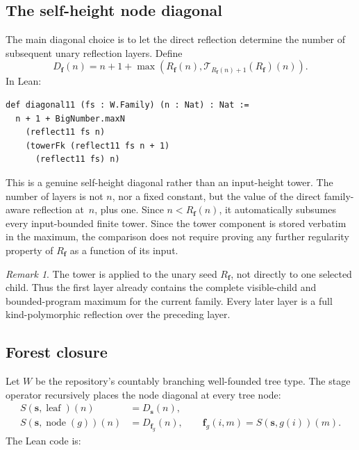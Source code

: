 \documentclass[11pt]{article}
\theoremstyle{definition}
\theoremstyle{remark}
\newtheorem{remark}[theorem]{Remark}
\newcommand{\Rfam}{\ensuremath{R_{\mathbf f}}}
\newcommand{\Dfam}{\ensuremath{D_{\mathbf f}}}
\begin{document}
\subsection{The self-height node diagonal}

The main diagonal choice is to let the direct reflection determine the number
of subsequent unary reflection layers. Define
\begin{equation}
\label{eq:diagonal11}
  \Dfam(n)=n+1+
  \max\left(
      \Rfam(n),
      \mathcal T_{\Rfam(n)+1}(\Rfam)(n)
  \right).
\end{equation}
In Lean:

\begin{lstlisting}
def diagonal11 (fs : W.Family) (n : Nat) : Nat :=
  n + 1 + BigNumber.maxN
    (reflect11 fs n)
    (towerFk (reflect11 fs n + 1)
      (reflect11 fs) n)
\end{lstlisting}

This is a genuine self-height diagonal rather than an input-height tower. The
number of layers is not $n$, nor a fixed constant, but the value of the direct
family-aware reflection at~$n$, plus one. Since $n<\Rfam(n)$, it automatically
subsumes every input-bounded finite tower. Since the tower component is stored
verbatim in the maximum, the comparison does not require proving any further
regularity property of $\Rfam$ as a function of its input.

\begin{remark}
The tower is applied to the unary seed $\Rfam$, not directly to one selected
child. Thus the first layer already contains the complete visible-child and
bounded-program maximum for the current family. Every later layer is a full
kind-polymorphic reflection over the preceding layer.
\end{remark}

\subsection{Forest closure}

Let $W$ be the repository's countably branching well-founded tree type. The
stage operator recursively places the node diagonal at every tree node:
\begin{align*}
  S(\mathbf s,\operatorname{leaf})(n)
    &=D_{\mathbf s}(n),\\
  S(\mathbf s,\operatorname{node}(g))(n)
    &=D_{\mathbf f_g}(n),
    \qquad
      \mathbf f_g(i,m)=S(\mathbf s,g(i))(m).
\end{align*}
The Lean code is:
\end{document}
